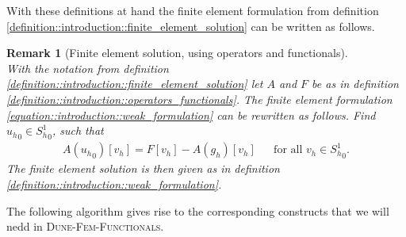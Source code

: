 \documentclass[a4paper,11pt]{article}
\numberwithin{equation}{section}
\newtheorem{remark}[definition]{Remark}
\newcommand{\theoremNewline}{\hspace{1mm}\\}
\newcommand{\theoremEndLine}{\hspace{1mm}}
\newcommand{\dunefemfunctionals}{\textsc{Dune-Fem-Functionals}\xspace}
\newcommand{\punkt}{\text{.}}
\begin{document}
    With these definitions at hand the finite element formulation from definition
    \ref{definition::introduction::finite_element_solution} can be written as follows.

    \begin{remark}[Finite element solution, using operators and functionals]\theoremNewline
      \label{remark::introduction::variational_formulation_functionals_operators}
      With the notation from definition \ref{definition::introduction::finite_element_solution} let $A$ and $F$ be as in
      definition \ref{definition::introduction::operators_functionals}. The finite element formulation
      \eqref{equation::introduction::weak_formulation} can be rewritten as follows.
      Find ${{u_h}_0 \in {S^1_h}_0}$, such that
      \begin{align}
        \label{equation::introduction::finite_element_formulation_functionals_operators}
        A({u_h}_0)[v_h] = F[v_h] - A(g_h)[v_h] &&\text{for all } v_h \in {S^1_h}_0 \punkt
      \end{align}
      The finite element solution is then given as in definition \ref{definition::introduction::weak_formulation}.
    \end{remark}\theoremEndLine

    The following algorithm gives rise to the corresponding constructs that we will nedd in \dunefemfunctionals.
\end{document}
